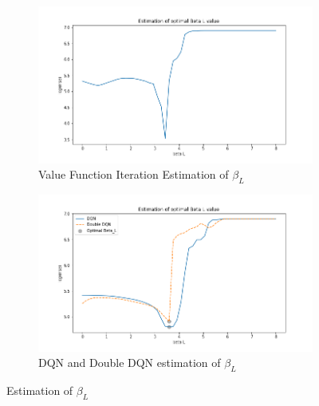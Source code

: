 \begin{figure}[ht]
\begin{subfigure}{.5\textwidth}
  \centering
  \includegraphics[width=1\linewidth]{figures/dqi_model1_estimation_Beta_L.png}
  \caption{Value Function Iteration Estimation of $\beta_L$}
  \label{fig:dqi_estimation_beta_L}
\end{subfigure}%
\begin{subfigure}{.5\textwidth}
  \centering
  \includegraphics[width=1\linewidth]{figures/dqn_ddqn_model1_estimation_Beta_L.png}
  \caption{DQN and Double DQN estimation of $\beta_L$}
  \label{fig:dqn_ddqn_estimation_beta_L}
\end{subfigure}
    \caption{Estimation of $\beta_L$}
    \label{fig:beta_L_estimation}
\end{figure}

